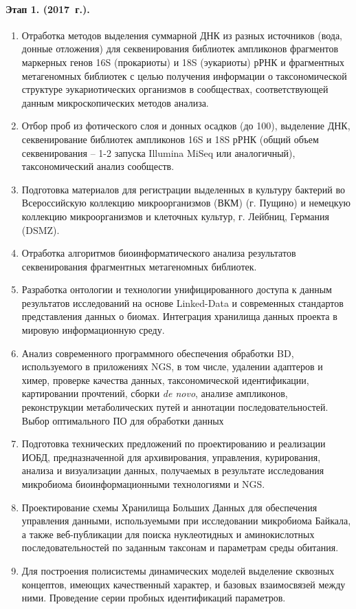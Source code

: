 \documentclass[a4paper,12pt,openany,final]{extreport}
\makeatletter
\newcommand\theyear{2017}
\def\vhrulefill#1{\leavevmode\leaders\hrule\@height#1\hfill \kern\z@}
\newcommand\bottomrule{\noindent\vhrulefill{2pt}}
\makeatother
\begin{document}
\paragraph{Этап 1. (\theyear~г.).}
\begin{enumerate}
\item Отработка методов выделения суммарной ДНК из разных
  источников (вода, донные отложения) для секвенирования библиотек
  ампликонов фрагментов маркерных генов 16S (прокариоты) и 18S
  (эукариоты) рРНК и фрагментных метагеномных библиотек с целью
  получения информации о таксономической структуре эукариотических
  организмов в сообществах, соответствующей данным микроскопических
  методов анализа.

\item  Отбор проб из фотического слоя и донных осадков (до 100), выделение
ДНК, секвенирование библиотек ампликонов 16S и 18S рРНК (общий объем
секвенирования -- 1-2 запуска Illumina MiSeq или аналогичный),
таксономический анализ сообществ.

\item  Подготовка материалов для регистрации выделенных в культуру бактерий
во Всероссийскую коллекцию микроорганизмов (ВКМ) (г. Пущино) и немецкую
коллекцию микроорганизмов и клеточных культур, г. Лейбниц, Германия
(DSMZ).

\item Отработка алгоритмов биоинформатического анализа результатов
секвенирования фрагментных метагеномных библиотек.

\item  Разработка онтологии и технологии унифицированного доступа к данным
результатов исследований на основе Linked-Data и современных стандартов
представления данных о биомах. Интеграция хранилища данных проекта в
мировую информационную среду.

\item  Анализ современного программного обеспечения обработки BD,
используемого в приложениях NGS, в том числе, удалении адаптеров и
химер, проверке качества данных, таксономической идентификации,
картировании прочтений, сборки \textit{de novo}, анализе ампликонов,
реконструкции метаболических путей и аннотации последовательностей.
Выбор оптимального ПО для обработки данных

\item  Подготовка технических предложений по проектированию и реализации
ИОБД, предназначенной для архивирования, управления, курирования,
анализа и визуализации данных, получаемых в результате исследования
микробиома биоинформационными технологиями и NGS.

\item  Проектирование схемы Хранилища Больших Данных для обеспечения
управления данными, используемыми при исследовании микробиома Байкала, а
также веб-публикации для поиска нуклеотидных и аминокислотных
последовательностей по заданным таксонам и параметрам среды обитания.

\item  Для построения полисистемы динамических моделей выделение сквозных
концептов, имеющих качественный характер, и базовых взаимосвязей между
ними. Проведение серии пробных идентификаций параметров.\strut
\end{enumerate}


\end{document}

